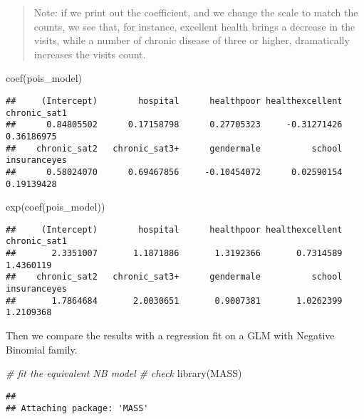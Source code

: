 \documentclass[
  oneside]{book}
\newenvironment{Shaded}{\begin{snugshade}}{\end{snugshade}}
\newcommand{\CommentTok}[1]{\textcolor[rgb]{0.56,0.35,0.01}{\textit{#1}}}
\newcommand{\FunctionTok}[1]{\textcolor[rgb]{0.00,0.00,0.00}{#1}}
\newcommand{\NormalTok}[1]{#1}
\begin{document}
\begin{quote}
Note: if we print out the coefficient, and we change the scale to match the
counts, we see that, for instance, excellent health brings a decrease in the visits,
while a number of chronic disease of three or higher, dramatically increases
the visits count.
\end{quote}

\begin{Shaded}
\begin{Highlighting}[]
\FunctionTok{coef}\NormalTok{(pois\_model)}
\end{Highlighting}
\end{Shaded}

\begin{verbatim}
##     (Intercept)        hospital      healthpoor healthexcellent    chronic_sat1 
##      0.84805502      0.17158798      0.27705323     -0.31271426      0.36186975 
##    chronic_sat2   chronic_sat3+      gendermale          school    insuranceyes 
##      0.58024070      0.69467856     -0.10454072      0.02590154      0.19139428
\end{verbatim}

\begin{Shaded}
\begin{Highlighting}[]
\FunctionTok{exp}\NormalTok{(}\FunctionTok{coef}\NormalTok{(pois\_model))}
\end{Highlighting}
\end{Shaded}

\begin{verbatim}
##     (Intercept)        hospital      healthpoor healthexcellent    chronic_sat1 
##       2.3351007       1.1871886       1.3192366       0.7314589       1.4360119 
##    chronic_sat2   chronic_sat3+      gendermale          school    insuranceyes 
##       1.7864684       2.0030651       0.9007381       1.0262399       1.2109368
\end{verbatim}

Then we compare the results with a regression fit on a GLM with Negative Binomial family.

\begin{Shaded}
\begin{Highlighting}[]
\CommentTok{\# fit the equivalent NB model}
\CommentTok{\# check}
\FunctionTok{library}\NormalTok{(MASS)}
\end{Highlighting}
\end{Shaded}

\begin{verbatim}
## 
## Attaching package: 'MASS'
\end{verbatim}
\end{document}
